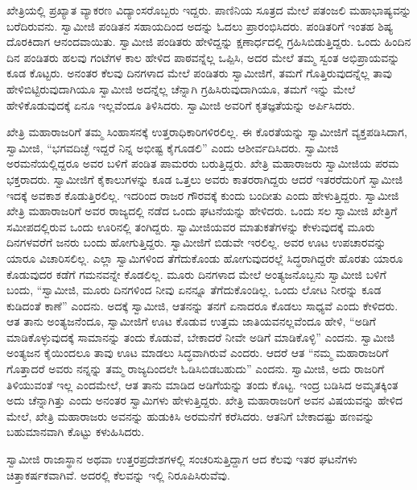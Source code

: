  ಖೇತ್ರಿಯಲ್ಲಿ ಪ್ರಖ್ಯಾತ ವ್ಯಾಕರಣ ವಿದ್ಯಾಂಸರೊಬ್ಬರು ಇದ್ದರು. ಪಾಣಿನಿಯ ಸೂತ್ರದ ಮೇಲೆ ಪತಂಜಲಿ ಮಹಾಭಾಷ್ಯವನ್ನು ಬರೆದಿರುವನು. ಸ್ವಾಮೀಜಿ ಪಂಡಿತನ ಸಹಾಯದಿಂದ ಅದನ್ನು ಓದಲು ಪ್ರಾರಂಭಿಸಿದರು. ಪಂಡಿತರಿಗೆ ಇಂತಹ ಶಿಷ್ಯ ದೊರಕಿದಾಗ ಆನಂದವಾಯಿತು. ಸ್ವಾಮೀಜಿ ಪಂಡಿತರು ಹೇಳಿದ್ದನ್ನು ಕ್ಷಣಾರ್ಧದಲ್ಲಿ ಗ್ರಹಿಸಿಬಿಡುತ್ತಿದ್ದರು. ಒಂದು ಹಿಂದಿನ ದಿನ ಪಂಡಿತರು ಹಲವು ಗಂಟೆಗಳ ಕಾಲ ಹೇಳಿದ ಪಾಠವನ್ನೆಲ್ಲ ಒಪ್ಪಿಸಿ, ಅದರ ಮೇಲೆ ತಮ್ಮ ಸ್ವಂತ ಅಭಿಪ್ರಾಯವನ್ನು ಕೂಡ ಕೊಟ್ಟರು. ಅನಂತರ ಕೆಲವು ದಿನಗಳಾದ ಮೇಲೆ ಪಂಡಿತರು ಸ್ವಾಮೀಜಿಗೆ, ತಮಗೆ ಗೊತ್ತಿರುವುದನ್ನೆಲ್ಲ ತಾವು ಹೇಳಿಬಿಟ್ಟಿರುವುದಾಗಿಯೂ ಸ್ವಾಮೀಜಿ ಅದನ್ನೆಲ್ಲ ಚೆನ್ನಾಗಿ ಗ್ರಹಿಸಿರುವುದಾಗಿಯೂ, ತಮಗೆ ಇನ್ನು ಮೇಲೆ ಹೇಳಿಕೊಡುವುದಕ್ಕೆ ಏನೂ ಇಲ್ಲವೆಂದೂ ತಿಳಿಸಿದರು. ಸ್ವಾಮೀಜಿ ಅವರಿಗೆ ಕೃತಜ್ಞತೆಯನ್ನು ಅರ್ಪಿಸಿದರು. 

 ಖೇತ್ರಿ ಮಹಾರಾಜರಿಗೆ ತಮ್ಮ ಸಿಂಹಾಸನಕ್ಕೆ ಉತ್ತರಾಧಿಕಾರಿಗಳಿರಲಿಲ್ಲ. ಈ ಕೊರತೆಯನ್ನು ಸ್ವಾಮೀಜಿಗೆ ವ್ಯಕ್ತಪಡಿಸಿದಾಗ, ಸ್ವಾಮೀಜಿ, “ಭಗವದಿಚ್ಛೆ ಇದ್ದರೆ ನಿನ್ನ ಅಭೀಷ್ಟ ಕೈಗೂಡಲಿ” ಎಂದು ಆಶೀರ್ವದಿಸಿದರು. ಸ್ವಾಮೀಜಿ ಅರಮನೆಯಲ್ಲಿದ್ದರೂ ಅವರ ಬಳಿಗೆ ಪಂಡಿತ ಪಾಮರರು ಬರುತ್ತಿದ್ದರು. ಖೇತ್ರಿ ಮಹಾರಾಜರು ಸ್ವಾಮೀಜಿಯ ಪರಮ ಭಕ್ತರಾದರು. ಸ್ವಾಮೀಜಿಗೆ ಕೈಕಾಲುಗಳನ್ನು ಕೂಡ ಒತ್ತಲು ಅವರು ಕಾತರರಾಗಿದ್ದರು ಆದರೆ ಇತರರೆದುರಿಗೆ ಸ್ವಾಮೀಜಿ ಇದಕ್ಕೆ ಅವಕಾಶ ಕೊಡುತ್ತಿರಲಿಲ್ಲ. ಇದರಿಂದ ರಾಜರ ಗೌರವಕ್ಕೆ ಕುಂದು ಬಂದೀತು ಎಂದು ಹೇಳುತ್ತಿದ್ದರು. ಸ್ವಾಮೀಜಿ ಖೇತ್ರಿ ಮಹಾರಾಜರಿಗೆ ಅವರ ರಾಜ್ಯದಲ್ಲಿ ನಡೆದ ಒಂದು ಘಟನೆಯನ್ನು ಹೇಳಿದರು. ಒಂದು ಸಲ ಸ್ವಾಮೀಜಿ ಖೇತ್ರಿಗೆ ಸಮೀಪದಲ್ಲಿರುವ ಒಂದು ಊರಿನಲ್ಲಿ ತಂಗಿದ್ದರು. ಸ್ವಾಮೀಜಿಯವರ ಮಾತುಕತೆಗಳನ್ನು ಕೇಳುವುದಕ್ಕೆ ಮೂರು ದಿನಗಳವರೆಗೆ ಜನರು ಬಂದು ಹೋಗುತ್ತಿದ್ದರು. ಸ್ವಾಮೀಜಿಗೆ ಬಿಡುವೇ ಇರಲಿಲ್ಲ. ಅವರ ಊಟ ಉಪಚಾರವನ್ನು ಯಾರೂ ವಿಚಾರಿಸಲಿಲ್ಲ. ಎಲ್ಲಾ ಸ್ವಾಮಿಗಳಿಂದ ತೆಗೆದುಕೊಂಡು ಹೋಗುವುದರಲ್ಲೆ ಸಿದ್ಧರಾಗಿದ್ದರೇ ಹೊರತು ಯಾರೂ ಕೊಡುವುದರ ಕಡೆಗೆ ಗಮನವನ್ನೇ ಕೊಡಲಿಲ್ಲ. ಮೂರು ದಿನಗಳಾದ ಮೇಲೆ ಅಂತ್ಯಜನೊಬ್ಬನು ಸ್ವಾಮೀಜಿ ಬಳಿಗೆ ಬಂದು, “ಸ್ವಾಮೀಜಿ, ಮೂರು ದಿನಗಳಿಂದ ನೀವು ಏನನ್ನೂ ತೆಗೆದುಕೊಂಡಿಲ್ಲ. ಒಂದು ಲೋಟ ನೀರನ್ನು ಕೂಡ ಕುಡಿದಂತೆ ಕಾಣೆ” ಎಂದನು. ಅದಕ್ಕೆ ಸ್ವಾಮೀಜಿ, ಆತನನ್ನು ತನಗೆ ಏನಾದರೂ ಕೊಡಲು ಸಾಧ್ಯವೆ ಎಂದು ಕೇಳಿದರು. ಆತ ತಾನು ಅಂತ್ಯಜನೆಂದೂ, ಸ್ವಾಮೀಜಿಗೆ ಊಟ ಕೊಡುವ ಉತ್ತಮ ಜಾತಿಯವನಲ್ಲವೆಂದೂ ಹೇಳಿ, “ಅಡಿಗೆ ಮಾಡಿಕೊಳ್ಳುವುದಕ್ಕೆ ಸಾಮಾನನ್ನು ತಂದು ಕೊಡುವೆ, ಬೇಕಾದರೆ ನೀವೇ ಅಡಿಗೆ ಮಾಡಿಕೊಳ್ಳಿ” ಎಂದನು. ಸ್ವಾಮೀಜಿ ಅಂತ್ಯಜನ ಕೈಯಿಂದಲೂ ತಾವು ಊಟ ಮಾಡಲು ಸಿದ್ಧವಾಗಿರುವೆ ಎಂದರು. ಆದರೆ ಆತ “ನಮ್ಮ ಮಹಾರಾಜರಿಗೆ ಗೊತ್ತಾದರೆ ಅವರು ನನ್ನನ್ನು ತಮ್ಮ ರಾಜ್ಯದಿಂದಲೇ ಓಡಿಸಿಬಿಡಬಹುದು” ಎಂದನು. ಸ್ವಾಮೀಜಿ, ಅದು ರಾಜರಿಗೆ ತಿಳಿಯುವಂತೆ ಇಲ್ಲ ಎಂದಮೇಲೆ, ಆತ ತಾನು ಮಾಡಿದ ಅಡಿಗೆಯನ್ನು ತಂದು ಕೊಟ್ಟ. ಇಂದ್ರ ಬಡಿಸಿದ ಅಮೃತಕ್ಕಿಂತ ಅದು ಚೆನ್ನಾಗಿತ್ತು ಎಂದು ಅನಂತರ ಸ್ವಾಮಿಗಳು ಹೇಳುತ್ತಿದ್ದರು. ಖೇತ್ರಿ ಮಹಾರಾಜರಿಗೆ ಅವನ ವಿಷಯವನ್ನು ಹೇಳಿದ ಮೇಲೆ, ಖೇತ್ರಿ ಮಹಾರಾಜರು ಅವನನ್ನು ಹುಡುಕಿಸಿ ಅರಮನೆಗೆ ಕರೆಸಿದರು. ಆತನಿಗೆ ಬೇಕಾದಷ್ಟು ಹಣವನ್ನು ಬಹುಮಾನವಾಗಿ ಕೊಟ್ಟು ಕಳುಹಿಸಿದರು. 

 ಸ್ವಾಮೀಜಿ ರಾಜಾಸ್ಥಾನ ಅಥವಾ ಉತ್ತರಪ್ರದೇಶಗಳಲ್ಲಿ ಸಂಚರಿಸುತ್ತಿದ್ದಾಗ ಆದ ಕೆಲವು ಇತರ ಘಟನೆಗಳು ಚಿತ್ತಾಕರ್ಷಕವಾಗಿವೆ. ಅದರಲ್ಲಿ ಕೆಲವನ್ನು ಇಲ್ಲಿ ನಿರೂಪಿಸಿರುವೆವು. 


